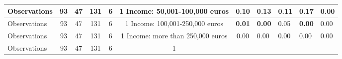 \begin{tabular}{l c c c c c c }
\midrule
Observations &        93 &        47 &       131 &         6 &         1
Income: 50,001-100,000 euros & \textbf{     0.10} & \textbf{     0.13} & \textbf{     0.11} &      0.17 &      0.00 \\
\midrule
Observations &        93 &        47 &       131 &         6 &         1
Income: 100,001-250,000 euros & \textbf{     0.01} & \textbf{     0.00} &      0.05 & \textbf{     0.00} &      0.00 \\
\midrule
Observations &        93 &        47 &       131 &         6 &         1
Income: more than 250,000 euros &      0.00 &      0.00 &      0.00 &      0.00 &      0.00 \\
\midrule
Observations &        93 &        47 &       131 &         6 &         1
\bottomrule
\end{tabular}
